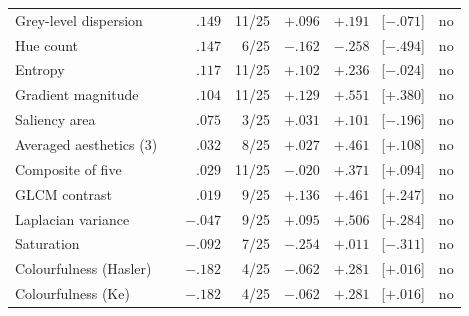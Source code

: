 \begin{table}[!ht]
\begin{tabular}{@{}l l r r r r c@{}}
Grey-level dispersion & \citep{jeong2016static} & $.149$ & 11/25 & $+.096$ & $+.191$ \ \tiny[$-.071$] & no \\
\rowcolor{rowlight}Hue count & \citep{ke2006highlevel} & $.147$ & 6/25 & $-.162$ & $-.258$ \ \tiny[$-.494$] & no \\
Entropy & \citep{qaroush2025diversity} & $.117$ & 11/25 & $+.102$ & $+.236$ \ \tiny[$-.024$] & no \\
\rowcolor{rowlight}Gradient magnitude & \citep{qaroush2025diversity} & $.104$ & 11/25 & $+.129$ & $+.551$ \ \tiny[$+.380$] & no \\
Saliency area & \citep{qaroush2025diversity} & $.075$ & 3/25 & $+.031$ & $+.101$ \ \tiny[$-.196$] & no \\
\rowcolor{rowlight}Averaged aesthetics (3) & \citep{gygli2014summe} & $.032$ & 8/25 & $+.027$ & $+.461$ \ \tiny[$+.108$] & no \\
Composite of five & \citep{srinivas2016rank} & $.029$ & 11/25 & $-.020$ & $+.371$ \ \tiny[$+.094$] & no \\
\rowcolor{rowlight}GLCM contrast & \citep{yang2024keyframe} & $.019$ & 9/25 & $+.136$ & $+.461$ \ \tiny[$+.247$] & no \\
Laplacian variance & \citep{cakmak2025tripss} & $-.047$ & 9/25 & $+.095$ & $+.506$ \ \tiny[$+.284$] & no \\
\rowcolor{rowlight}Saturation & \citep{huang2024aesthetic} & $-.092$ & 7/25 & $-.254$ & $+.011$ \ \tiny[$-.311$] & no \\
Colourfulness (Hasler) & \citep{hasler2003colorfulness} & $-.182$ & 4/25 & $-.062$ & $+.281$ \ \tiny[$+.016$] & no \\
\rowcolor{rowlight}Colourfulness (Ke) & \citep{ke2006highlevel} & $-.182$ & 4/25 & $-.062$ & $+.281$ \ \tiny[$+.016$] & no \\
\bottomrule
\end{tabular}
\end{table}
